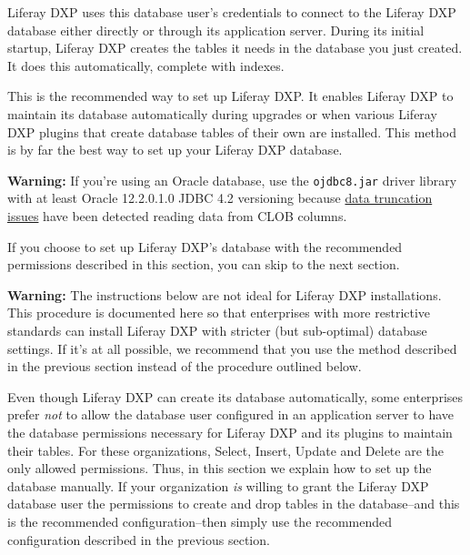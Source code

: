 \noindent\hrulefill

Liferay DXP uses this database user's credentials to connect to the
Liferay DXP database either directly or through its application server.
During its initial startup, Liferay DXP creates the tables it needs in
the database you just created. It does this automatically, complete with
indexes.

This is the recommended way to set up Liferay DXP. It enables Liferay DXP
to maintain its database automatically during upgrades or when various
Liferay DXP plugins that create database tables of their own are
installed. This method is by far the best way to set up your Liferay DXP
database.

\noindent\hrulefill

\textbf{Warning:} If you're using an Oracle database, use the
\texttt{ojdbc8.jar} driver library with at least Oracle 12.2.0.1.0 JDBC
4.2 versioning because
\href{https://issues.liferay.com/browse/LPS-79229}{data truncation
issues} have been detected reading data from CLOB columns.

\noindent\hrulefill

If you choose to set up Liferay DXP's database with the recommended
permissions described in this section, you can skip to the next section.

\noindent\hrulefill

\textbf{Warning:} The instructions below are not ideal for Liferay DXP
installations. This procedure is documented here so that enterprises
with more restrictive standards can install Liferay DXP with stricter
(but sub-optimal) database settings. If it's at all possible, we
recommend that you use the method described in the previous section
instead of the procedure outlined below.

\noindent\hrulefill

Even though Liferay DXP can create its database automatically, some
enterprises prefer \emph{not} to allow the database user configured in
an application server to have the database permissions necessary for
Liferay DXP and its plugins to maintain their tables. For these
organizations, Select, Insert, Update and Delete are the only allowed
permissions. Thus, in this section we explain how to set up the database
manually. If your organization \emph{is} willing to grant the Liferay
DXP database user the permissions to create and drop tables in the
database--and this is the recommended configuration--then simply use the
recommended configuration described in the previous section.

